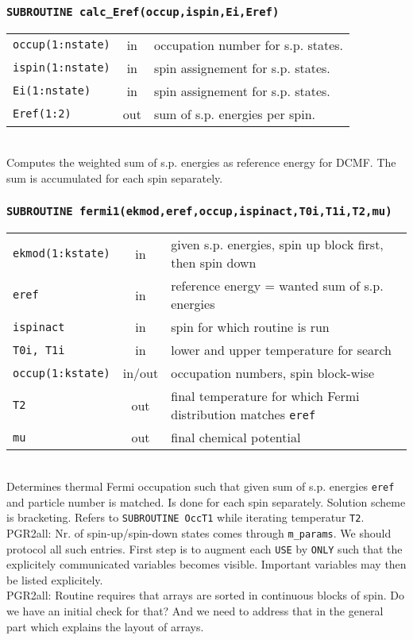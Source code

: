 \documentclass[final,1p]{elsarticle}
\newcommand{\PGRcomm}[1]{{\color{blue}\small PGR2all: #1}}
\begin{document}
\subsubsection*{\tt SUBROUTINE calc\_Eref(occup,ispin,Ei,Eref)}
\begin{tabular}{lcl}
 {\tt occup(1:nstate)} & in & occupation number for s.p. states.\\
 {\tt ispin(1:nstate)} & in & spin assignement for s.p. states.\\
 {\tt Ei(1:nstate)} & in & spin assignement for s.p. states.\\
 {\tt Eref(1:2)} & out & sum of s.p. energies per spin.\\
\end{tabular}
\\
Computes the weighted sum of s.p. energies as reference energy
for DCMF. The sum is accumulated for each spin separately.


\subsubsection*{\tt SUBROUTINE fermi1(ekmod,eref,occup,ispinact,T0i,T1i,T2,mu)}
\begin{tabular}{lcl}
 {\tt ekmod(1:kstate)} & in & given s.p. energies, spin up block first, then
 spin down\\
 {\tt eref}& in & reference energy = wanted sum of s.p. energies\\
 {\tt ispinact}& in & spin for which routine is run\\
 {\tt T0i, T1i}& in & lower and upper temperature for search\\
 {\tt occup(1:kstate)}& in/out & occupation numbers, spin block-wise\\
 {\tt T2} & out & final temperature for which Fermi distribution
 matches {\tt eref} \\
 {\tt mu} & out & final chemical potential\\
\end{tabular}
\\[4pt]
Determines thermal Fermi occupation such that given sum of
s.p. energies {\tt eref} and particle number is matched. Is done for
each spin separately. Solution scheme is bracketing. Refers to 
{\tt SUBROUTINE OccT1} while iterating temperatur {\tt T2}.
\\
\PGRcomm{Nr. of spin-up/spin-down states comes through {\tt m\_params}. 
We should protocol all such entries. First step is to augment each
{\tt USE} by {\tt ONLY} such that the explicitely communicated
variables becomes visible. Important variables may then be listed
explicitely.
}
\\
\PGRcomm{Routine requires that arrays are sorted in continuous blocks of
  spin. Do we have an initial check for that? And we need to address
  that in the general part which explains the layout of arrays.}
\end{document}
